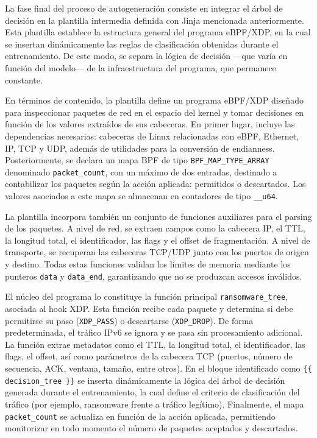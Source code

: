 
La fase final del proceso de autogeneración consiste en integrar el árbol de decisión en la plantilla intermedia definida con Jinja mencionada anteriormente. Esta plantilla establece la estructura general del programa eBPF/XDP, en la cual se insertan dinámicamente las reglas de clasificación obtenidas durante el entrenamiento. De este modo, se separa la lógica de decisión —que varía en función del modelo— de la infraestructura del programa, que permanece constante.

En términos de contenido, la plantilla define un programa eBPF/XDP diseñado para inspeccionar paquetes de red en el espacio del kernel y tomar decisiones en función de los valores extraídos de sus cabeceras. En primer lugar, incluye las dependencias necesarias: cabeceras de Linux relacionadas con eBPF, Ethernet, IP, TCP y UDP, además de utilidades para la conversión de endianness. Posteriormente, se declara un mapa BPF de tipo \verb|BPF_MAP_TYPE_ARRAY| denominado \verb|packet_count|, con un máximo de dos entradas, destinado a contabilizar los paquetes según la acción aplicada: permitidos o descartados. Los valores asociados a este mapa se almacenan en contadores de tipo \verb|__u64|.

La plantilla incorpora también un conjunto de funciones auxiliares para el parsing de los paquetes. A nivel de red, se extraen campos como la cabecera IP, el TTL, la longitud total, el identificador, las flags y el offset de fragmentación. A nivel de transporte, se recuperan las cabeceras TCP/UDP junto con los puertos de origen y destino. Todas estas funciones validan los límites de memoria mediante los punteros \verb|data| y \verb|data_end|, garantizando que no se produzcan accesos inválidos.

El núcleo del programa lo constituye la función principal \verb|ransomware_tree|, asociada al hook XDP. Esta función recibe cada paquete y determina si debe permitirse su paso (\verb|XDP_PASS|) o descartarse (\verb|XDP_DROP|). De forma predeterminada, el tráfico IPv6 se ignora y se pasa sin procesamiento adicional. La función extrae metadatos como el TTL, la longitud total, el identificador, las flags, el offset, así como parámetros de la cabecera TCP (puertos, número de secuencia, ACK, ventana, tamaño, entre otros). En el bloque identificado como \verb|{{ decision_tree }}| se inserta dinámicamente la lógica del árbol de decisión generada durante el entrenamiento, la cual define el criterio de clasificación del tráfico (por ejemplo, ransomware frente a tráfico legítimo). Finalmente, el mapa \verb|packet_count| se actualiza en función de la acción aplicada, permitiendo monitorizar en todo momento el número de paquetes aceptados y descartados.

